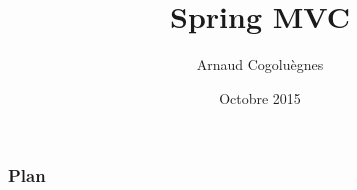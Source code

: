 \documentclass{beamer}
\title{Spring MVC}
\author{Arnaud Cogoluègnes}
\institute{Zenika}
\date{Octobre 2015}
\begin{document}
\begin{frame}
\titlepage
\end{frame}

\begin{frame}
 \frametitle{Plan}
 \scriptsize{\tableofcontents}
\end{frame}

%
%
%
%
%

%
%
%
\end{document}
